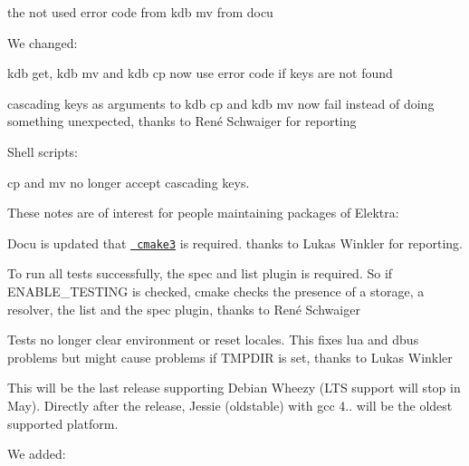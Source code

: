 \begin{DoxyItemize}
\item the not used error code {} from {\ttfamily kdb mv} from docu
\end{DoxyItemize}

We changed\+:


\begin{DoxyItemize}
\item {\ttfamily kdb get}, {\ttfamily kdb mv} and {\ttfamily kdb cp} now use error code {} if keys are not found
\item cascading keys as arguments to {\ttfamily kdb cp} and {\ttfamily kdb mv} now fail instead of doing something unexpected, thanks to René Schwaiger for reporting
\end{DoxyItemize}

Shell scripts\+:


\begin{DoxyItemize}
\item cp and mv no longer accept cascading keys.
\end{DoxyItemize}

These notes are of interest for people maintaining packages of Elektra\+:


\begin{DoxyItemize}
\item Docu is updated that \href{https://cmake.org/cmake/help/v3.0/}{\texttt{ cmake3}} is required. thanks to Lukas Winkler for reporting.
\item To run all tests successfully, the {\ttfamily spec} and {\ttfamily list} plugin is required. So if {\ttfamily E\+N\+A\+B\+L\+E\+\_\+\+T\+E\+S\+T\+I\+NG} is checked, cmake checks the presence of a storage, a resolver, the list and the spec plugin, thanks to René Schwaiger
\item Tests no longer clear environment or reset locales. This fixes lua and dbus problems but might cause problems if T\+M\+P\+D\+IR is set, thanks to Lukas Winkler
\item This will be the last release supporting Debian Wheezy (L\+TS support will stop in May). Directly after the release, Jessie (oldstable) with gcc 4.. will be the oldest supported platform.
\end{DoxyItemize}

We added\+:


